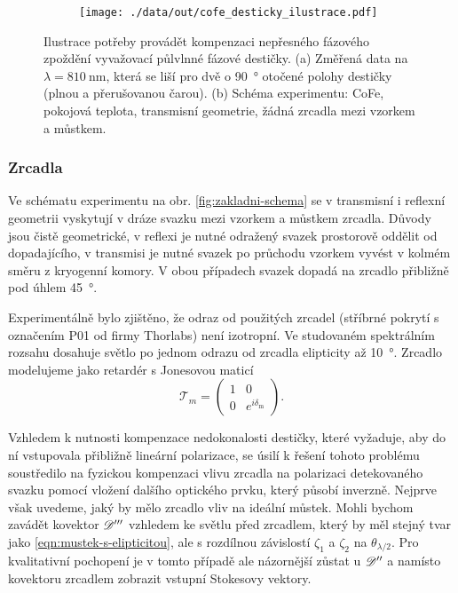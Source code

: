 \begin{figure}[htbp]
    \centering
    \begin{subfigure}{.55\textwidth}
        \centering
        \texttt{[image: ./data/out/cofe\_desticky\_ilustrace.pdf]}
    \end{subfigure}
    \begin{subfigure}{.43\textwidth}
        \centering
    \end{subfigure}
    \caption{Ilustrace potřeby provádět kompenzaci nepřesného fázového zpoždění vyvažovací půlvlnné fázové destičky. (a) Změřená data na $\lambda=\SI{810}{\nano\meter}$, která se liší pro dvě o \SI{90}{\degree} otočené polohy destičky (plnou a přerušovanou čarou). (b) Schéma experimentu: CoFe, pokojová teplota, transmisní geometrie, žádná zrcadla mezi vzorkem a můstkem.}
    \label{fig:mustek-desticka-ilustrace}
\end{figure}

\subsubsection*{Zrcadla}

Ve schématu experimentu na obr. \ref{fig:zakladni-schema} se v transmisní i reflexní geometrii vyskytují v dráze svazku mezi vzorkem a můstkem zrcadla.
Důvody jsou čistě geometrické, v reflexi je nutné odražený svazek prostorově oddělit od dopadajícího, v transmisi je nutné svazek po průchodu vzorkem vyvést v kolmém směru z kryogenní komory.
V obou případech svazek dopadá na zrcadlo přibližně pod úhlem \SI{45}{\degree}.

Experimentálně bylo zjištěno, že odraz od použitých zrcadel (stříbrné pokrytí s označením P01 od firmy Thorlabs) není izotropní.
Ve studovaném spektrálním rozsahu dosahuje světlo po jednom odrazu od zrcadla elipticity až \SI{10}{\degree}.
Zrcadlo modelujeme jako retardér s Jonesovou maticí
\begin{equation}
    \mathcal{T}_m = \begin{pmatrix} 1&0\\0&e^{i\delta_\textrm{m}} \end{pmatrix} .
\end{equation}

Vzhledem k nutnosti kompenzace nedokonalosti destičky, které vyžaduje, aby do ní vstupovala přibližně lineární polarizace, se úsilí k řešení tohoto problému soustředilo na fyzickou kompenzaci vlivu zrcadla na polarizaci detekovaného svazku pomocí vložení dalšího optického prvku, který působí inverzně.
Nejprve však uvedeme, jaký by mělo zrcadlo vliv na ideální můstek.
Mohli bychom zavádět kovektor $\mathscr{D}'''$ vzhledem ke světlu před zrcadlem, který by měl stejný tvar jako \eqref{eqn:mustek-s-elipticitou}, ale s rozdílnou závislostí $\zeta_1$ a $\zeta_2$ na $\theta_{\lambda/2}$.
Pro kvalitativní pochopení je v tomto případě ale názornější zůstat u $\mathscr{D}''$ a namísto kovektoru zrcadlem zobrazit vstupní Stokesovy vektory.

